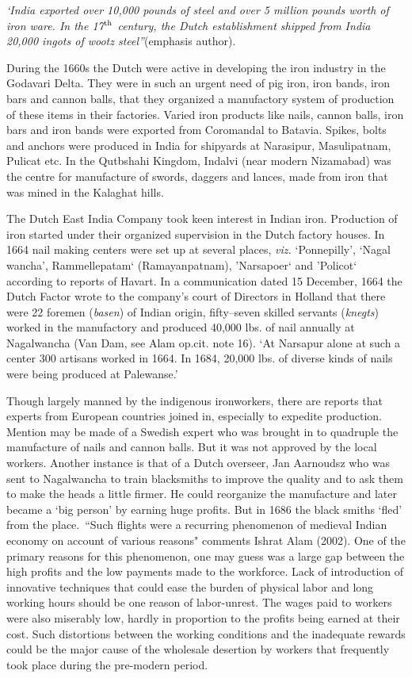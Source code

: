 {\it ‘India exported over 10,000 pounds of steel and over 5 million pounds worth of iron ware. In the 17$^{\rm th}$ century, the Dutch establishment shipped from India 20,000 ingots of wootz steel”}(emphasis author).  

During the 1660s the Dutch were active in developing the iron industry in the Godavari Delta.  They were in such an urgent need of pig iron, iron bands, iron bars and cannon balls, that they organized a manufactory system of production of these items in their factories.  Varied iron products like nails, cannon balls, iron bars and iron bands were exported from Coromandal to Batavia.  Spikes, bolts and anchors were produced in India for shipyards at Narasipur, Masulipatnam, Pulicat etc.  In the Qutbshahi Kingdom, Indalvi (near modern Nizamabad) was the centre for manufacture of swords, daggers and lances, made from iron that was mined in the Kalaghat hills.

The Dutch East India Company took keen interest in Indian iron. Production of iron started under their organized supervision in the Dutch factory houses. In 1664 nail making centers were set up at several places, {\it viz.} `Ponnepilly', `Nagal wancha', Rammellepatam` (Ramayanpatnam), 'Narsapoer` and 'Policot` according to reports of Havart. In a communication dated 15 December, 1664 the Dutch Factor wrote to the company's court of Directors in Holland that there were 22 foremen ({\it basen}) of Indian origin, fifty–seven skilled servants ({\it knegts}) worked in the manufactory and produced 40,000 lbs. of nail annually at Nagalwancha (Van Dam, see Alam op.cit. note 16). `At Narsapur alone at such a center 300 artisans worked in 1664. In 1684, 20,000 lbs. of diverse kinds of nails were being produced at Palewanse.'

Though largely manned by the indigenous ironworkers, there are reports that experts from European countries joined in, especially to expedite production. Mention may be made of a Swedish expert who was brought in to quadruple the manufacture of nails and cannon balls. But it was not approved by the local workers. Another instance is that of a Dutch overseer, Jan Aarnoudsz who was sent to Nagalwancha to train blacksmiths to improve the quality and to ask them to make the heads a little firmer. He could reorganize the manufacture and later became a `big person' by earning huge profits. But in 1686 the black smiths `fled' from the place.~“Such flights were a recurring phenomenon of medieval Indian economy on account of various reasons" comments Ishrat Alam (2002). One of the primary reasons for this phenomenon, one may guess was a large gap between the high profits and the low payments made to the workforce. Lack of introduction of innovative techniques that could ease the burden of physical labor and long working hours should be one reason of labor-unrest. The wages paid to workers were also miserably low, hardly in proportion to the profits being earned at their cost. Such distortions between the working conditions and the inadequate rewards could be the major cause of the wholesale desertion by workers that frequently took place during the pre-modern period.  

